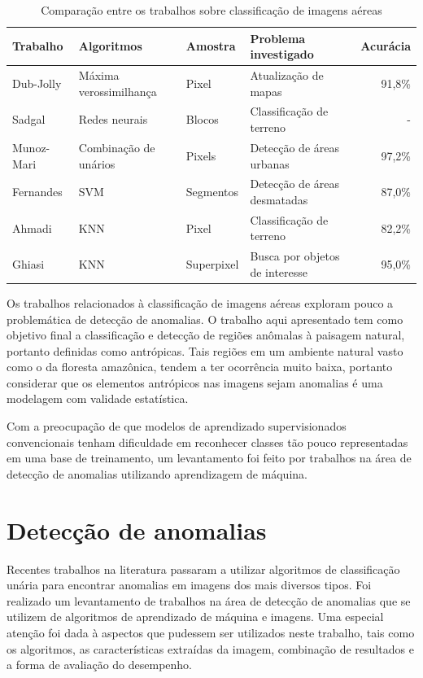 \begin{table}[h]
\ABNTEXfontereduzida
\centering
\begin{tabulary}{\linewidth}{|L|L|L|L|R|}
\hline
\textbf{Trabalho} &  \textbf{Algoritmos} & \textbf{Amostra} & \textbf{Problema investigado} &  \textbf{Acurácia} \\ \hline
Dub-Jolly  & Máxima verossimilhança & Pixel      & Atualização de mapas           & 91,8\% \\ \hline
Sadgal     & Redes neurais          & Blocos     & Classificação de terreno       & -       \\ \hline
Munoz-Mari & Combinação de unários  & Pixels     & Detecção de áreas urbanas      & 97,2\%    \\ \hline
Fernandes  & SVM                    & Segmentos  & Detecção de áreas desmatadas   & 87,0\%    \\ \hline
Ahmadi     & KNN                    & Pixel      & Classificação de terreno       & 82,2\% \\ \hline
Ghiasi     & KNN                    & Superpixel & Busca por objetos de interesse & 95,0\%    \\ \hline
\end{tabulary}
\caption{Comparação entre os trabalhos sobre classificação de imagens aéreas}
\label{tab:sumarioClassificacao}
\end{table}

Os trabalhos relacionados à classificação de imagens aéreas exploram pouco a problemática de detecção de anomalias. O trabalho aqui apresentado tem como objetivo final a classificação e detecção de regiões anômalas à paisagem natural, portanto definidas como antrópicas. Tais regiões em um ambiente natural vasto como o da floresta amazônica, tendem a ter ocorrência muito baixa, portanto considerar que os elementos antrópicos nas imagens sejam anomalias é uma modelagem com validade estatística.

Com a preocupação de que modelos de aprendizado supervisionados convencionais tenham dificuldade em reconhecer classes tão pouco representadas em uma base de treinamento, um levantamento foi feito por trabalhos na área de detecção de anomalias utilizando aprendizagem de máquina.

\section{Detecção de anomalias}\label{sec:trAnomalias}

Recentes trabalhos na literatura passaram a utilizar algoritmos de classificação unária para encontrar anomalias em imagens dos mais diversos tipos. Foi realizado um levantamento de trabalhos na área de detecção de anomalias que se utilizem de algoritmos de aprendizado de máquina e imagens. Uma especial atenção foi dada à aspectos que pudessem ser utilizados neste trabalho, tais como os algoritmos, as características extraídas da imagem, combinação de resultados e a forma de avaliação do desempenho.

